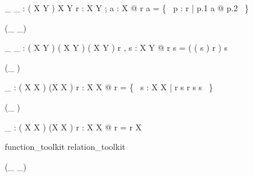 \begin{gendef}[X,Y]
\_ \limg \_ \rimg : ( X \rel Y ) \cross \power X \fun \power Y
\where
\forall r : X \rel Y ; a : \power X @ r \limg a \rimg = \{~ p : r | p.1 \in a @ p.2 ~\}
\end{gendef}

\begin{zed}
 \leftassoc (\_ \oplus \_)
\end{zed}

\begin{gendef}[X,Y]
\_ \oplus \_ : ( X \rel Y ) \cross ( X \rel Y ) \fun ( X \rel Y )
\where
\forall r , s : X \rel Y @ r \oplus s = ( ( \dom s ) \ndres r ) \cup s
\end{gendef}

\begin{zed}
\function (\_ \plus)
\end{zed}

\begin{gendef}[X]
\_ \plus : ( X \rel X ) \fun (X \rel X )
\where
\forall r : X \rel X @
r \plus = \bigcap \{~ s : X \rel X | r \subseteq s \land r \comp s \subseteq s ~\}
\end{gendef}

\begin{zed}
\function (\_ \star)
\end{zed}

\begin{gendef}[X]
\_ \star : ( X \rel X ) \fun (X \rel X )
\where
\forall r : X \rel X @ r \star = r \plus \cup \id X
\end{gendef}

\begin{zsection}
\SECTION function\_toolkit \parents relation\_toolkit
\end{zsection}
\begin{zed}
 \rightassoc (\_ \pfun \_)
\end{zed}

